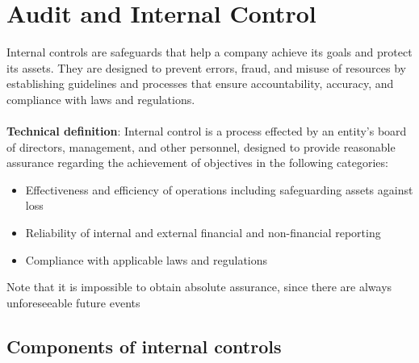 \documentclass{article}
\begin{document}
\section{Audit and Internal Control}

	Internal controls are safeguards that help a company achieve its goals and protect its assets. They are designed to prevent errors, fraud, and misuse of resources by establishing guidelines and processes that ensure accountability, accuracy, and compliance with laws and regulations.
	\\ \\
	\textbf{Technical definition}: Internal control is a process effected by an entity's board of directors, management, and other personnel, designed to provide reasonable assurance regarding the achievement of objectives in the following categories:
	\begin{itemize}
		\item Effectiveness and efficiency of operations including safeguarding assets against loss
		\item Reliability of internal and external financial and non-financial reporting
		\item Compliance with applicable laws and regulations
	\end{itemize}

	Note that it is impossible to obtain absolute assurance, since there are always unforeseeable future events

	\subsection{Components of internal controls}
\end{document}
